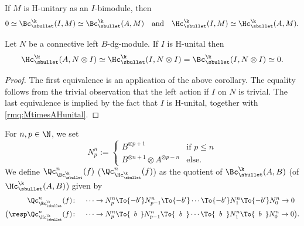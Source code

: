 \begin{cor}\label{cor:HIHA}
If $M$ is H-unitary as an $I$-bimodule, then
\[
0 \simeq \Bc_\sbullet^\k(I,M) \simeq \Bc_\sbullet^\k(A,M) \quad \text{and} \quad \Hc_\sbullet^\k(I,M) \simeq \Hc_\sbullet^\k(A,M).
\]
\end{cor}

\begin{cor}\label{cor:BmodHunital}
Let $N$ be a connective left $B$-dg-module.
If $I$ is H-unital then
\[
\Hc_\sbullet^\k(A, N \otimes I) \simeq \Hc_\sbullet^\k(I, N \otimes I) = \Bc_\sbullet^\k(I, N \otimes I) \simeq 0.
\]
\end{cor}

\begin{proof}
The first equivalence is an application of the above corollary. The equality follows from the trivial observation that the left action if $I$ on $N$ is trivial. The last equivalence is implied by the fact that $I$ is H-unital, together with \autoref{rmq:MtimesAHunital}.
\end{proof}

\label{par:quotfiltration}
For $n,p \in \N$, we set
\[
N^n_p := \begin{cases}
B^{\otimes p+1} & \text{if } p \leq n \\
B^{\otimes n+1} \otimes A^{\otimes p-n} & \text{else.}
\end{cases}
\]
We define $\Qc_{\Bc_\sbullet^\k}^n(f)$ (\resp $\Qc_{\Hc_\sbullet^\k}^n(f)$) as the quotient of $\Bc_\sbullet^\k(A,B)$ (\resp of $\Hc_\sbullet^\k(A,B)$) given by
\begin{align*}
\Qc_{\Bc_\sbullet^\k}^n(f) \colon& \quad \cdots \to N^n_p \To{-b'} N^n_{p-1} \To{-b'} \cdots \To{-b'} N^n_1 \To{-b'} N^n_0 \to 0 \\
\bigl(\resp \Qc_{\Hc_\sbullet^\k}^n(f) \colon& \quad \cdots \to N^n_p \To{\hspace*{1.7mm}b\hspace*{1.7mm}} N^n_{p-1} \To{\hspace*{1.9mm}b\hspace*{1.9mm}} \cdots \To{\hspace*{1.9mm}b\hspace*{1.9mm}} N^n_1 \To{\hspace*{1.8mm}b\hspace*{1.8mm}} N^n_0 \to 0 \bigr).
\end{align*}

